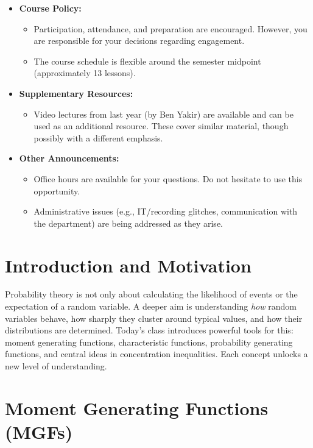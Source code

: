 \documentclass[12pt]{article}
\newenvironment{administrative_note}
  {\begin{center}\begin{Sbox}\begin{minipage}{0.9\textwidth}\small\textbf{Administrative Information:}\par}
  {\end{minipage}\end{Sbox}\fbox{\TheSbox}\end{center}}
\begin{document}
\begin{administrative_note}
\begin{itemize}[leftmargin=1.7em]
    \item \textbf{Course Policy:}
    \begin{itemize}
        \item Participation, attendance, and preparation are encouraged. However, you are responsible for your decisions regarding engagement.
        \item The course schedule is flexible around the semester midpoint (approximately 13 lessons).
    \end{itemize}
    \item \textbf{Supplementary Resources:}
    \begin{itemize}
        \item Video lectures from last year (by Ben Yakir) are available and can be used as an additional resource. These cover similar material, though possibly with a different emphasis.
    \end{itemize}
    \item \textbf{Other Announcements:}
    \begin{itemize}
        \item Office hours are available for your questions. Do not hesitate to use this opportunity.
        \item Administrative issues (e.g., IT/recording glitches, communication with the department) are being addressed as they arise.
    \end{itemize}
\end{itemize}
\end{administrative_note}

\tableofcontents

\section{Introduction and Motivation}
Probability theory is not only about calculating the likelihood of events or the expectation of a random variable. A deeper aim is understanding \emph{how} random variables behave, how sharply they cluster around typical values, and how their distributions are determined. Today's class introduces powerful tools for this: moment generating functions, characteristic functions, probability generating functions, and central ideas in concentration inequalities. Each concept unlocks a new level of understanding.

\section{Moment Generating Functions (MGFs)}
\end{document}
